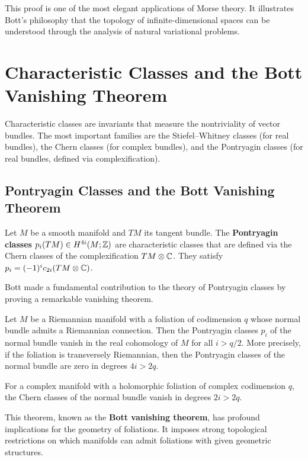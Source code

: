 This proof is one of the most elegant applications of Morse theory. It illustrates Bott's philosophy that the topology of infinite-dimensional spaces can be understood through the analysis of natural variational problems.

\section{Characteristic Classes and the Bott Vanishing Theorem}

Characteristic classes are invariants that measure the nontriviality of vector bundles. The most important families are the Stiefel--Whitney classes (for real bundles), the Chern classes (for complex bundles), and the Pontryagin classes (for real bundles, defined via complexification).

\subsection{Pontryagin Classes and the Bott Vanishing Theorem}

Let \(M\) be a smooth manifold and \(TM\) its tangent bundle. The \textbf{Pontryagin classes} \(p_i(TM) \in H^{4i}(M; \mathbb{Z})\) are characteristic classes that are defined via the Chern classes of the complexification \(TM \otimes \mathbb{C}\). They satisfy \(p_i = (-1)^i c_{2i}(TM \otimes \mathbb{C})\).

Bott made a fundamental contribution to the theory of Pontryagin classes by proving a remarkable vanishing theorem.

\begin{theorem}
Let \(M\) be a Riemannian manifold with a foliation of codimension \(q\) whose normal bundle admits a Riemannian connection. Then the Pontryagin classes \(p_i\) of the normal bundle vanish in the real cohomology of \(M\) for all \(i > q/2\). More precisely, if the foliation is transversely Riemannian, then the Pontryagin classes of the normal bundle are zero in degrees \(4i > 2q\).

For a complex manifold with a holomorphic foliation of complex codimension \(q\), the Chern classes of the normal bundle vanish in degrees \(2i > 2q\).
\end{theorem}

This theorem, known as the \textbf{Bott vanishing theorem}, has profound implications for the geometry of foliations. It imposes strong topological restrictions on which manifolds can admit foliations with given geometric structures.

